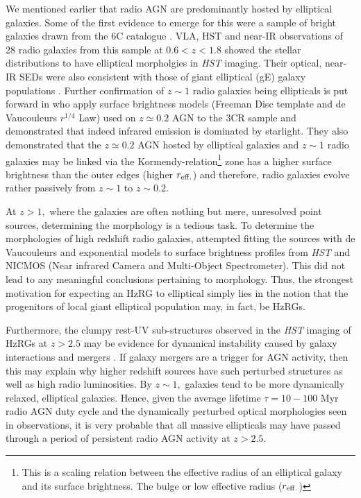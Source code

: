 \documentclass[10pt,a4paper]{article}
\begin{document}
We mentioned earlier that radio AGN are predominantly hosted by elliptical galaxies. Some of the first evidence to emerge for this were a sample of bright galaxies drawn from the 6C catalogue \citep{Eales1985a,Eales1985b}. VLA, HST and near-IR observations of 28 radio galaxies from this sample at $0.6 < z < 1.8$ showed the stellar distributions to have elliptical morpholgies in {\it HST} imaging. Their optical, near-IR SEDs were also consistent with those of giant elliptical (gE) galaxy populations \citep{Best1997}. Further confirmation of $z \sim 1$ radio galaxies being ellipticals is put forward in \citet{McLureDunlop2000} who apply surface brightness models (Freeman Disc template and de Vaucouleurs $r^{1/4}$ Law) used on $z \simeq 0.2$ AGN to the 3CR sample and demonstrated that indeed infrared emission is dominated by starlight. They also demonstrated that the $z \simeq 0.2$ AGN hosted by elliptical galaxies and $z \sim 1$ radio galaxies may be linked via the Kormendy-relation\footnote{This is a scaling relation between the effective radius of an elliptical galaxy and its surface brightness. The bulge or low effective radius ($r_{\rm eff.}$)} zone has a higher surface brightness than the outer edges (higher $r_{\rm eff.}$) and therefore, radio galaxies evolve rather passively from $z\sim1$ to $z\sim0.2.$

At $z > 1,$ where the galaxies are often nothing but mere, unresolved point sources, determining the morphology is a tedious task. To determine the morphologies of high redshift radio galaxies, \citet{pentericci2001} attempted fitting the sources with de Vaucouleurs and exponential models to surface brightness profiles from {\it HST} and NICMOS (Near infrared Camera and Multi-Object Spectrometer). This did not lead to any meaningful conclusions pertaining to morphology. Thus, the strongest motivation for expecting an HzRG to elliptical simply lies in the notion that the progenitors of local giant elliptical population may, in fact, be HzRGs. 

Furthermore, the clumpy rest-UV sub-structures observed in the {\it HST} imaging of HzRGs at $z > 2.5$ may be evidence for dynamical instability caused by galaxy interactions and mergers \citep{pentericci2001}. 
If galaxy mergers are a trigger for AGN activity, then this may explain why higher redshift sources have such perturbed structures as well as high radio luminosities. By $z \sim 1,$ galaxies tend to be more dynamically relaxed, elliptical galaxies. Hence, given the average lifetime $\tau=10-100$ Myr radio AGN duty cycle and the dynamically perturbed optical morphologies seen in observations, it is very probable that all massive ellipticals may have passed through a period of persistent radio AGN activity at $z > 2.5.$ 
\end{document}
